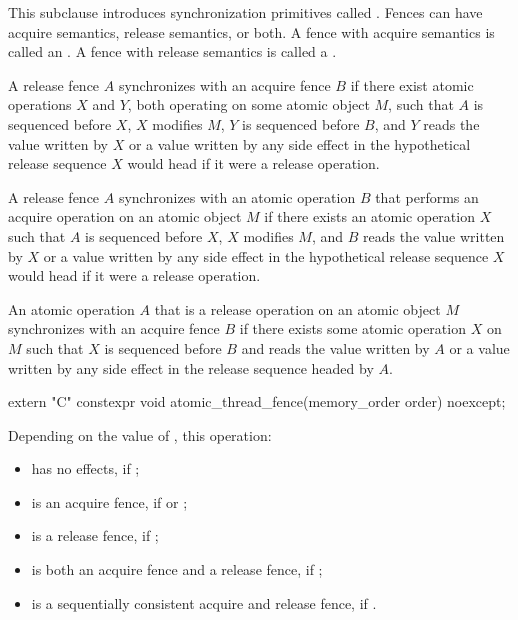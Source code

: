 \pnum
This subclause introduces synchronization primitives called . Fences can have
acquire semantics, release semantics, or both. A fence with acquire semantics is called
an . A fence with release semantics is called a .

\pnum
A release fence $A$ synchronizes with an acquire fence $B$ if there exist
atomic operations $X$ and $Y$, both operating on some atomic object
$M$, such that $A$ is sequenced before $X$, $X$ modifies
$M$, $Y$ is sequenced before $B$, and $Y$ reads the value
written by $X$ or a value written by any side effect in the hypothetical release
sequence $X$ would head if it were a release operation.

\pnum
A release fence $A$ synchronizes with an atomic operation $B$ that
performs an acquire operation on an atomic object $M$ if there exists an atomic
operation $X$ such that $A$ is sequenced before $X$, $X$
modifies $M$, and $B$ reads the value written by $X$ or a value
written by any side effect in the hypothetical release sequence $X$ would head if
it were a release operation.

\pnum
An atomic operation $A$ that is a release operation on an atomic object
$M$ synchronizes with an acquire fence $B$ if there exists some atomic
operation $X$ on $M$ such that $X$ is sequenced before $B$
and reads the value written by $A$ or a value written by any side effect in the
release sequence headed by $A$.

%
\begin{itemdecl}
extern "C" constexpr void atomic_thread_fence(memory_order order) noexcept;
\end{itemdecl}

\begin{itemdescr}
\pnum
\effects
Depending on the value of , this operation:
\begin{itemize}
\item has no effects, if ;

\item is an acquire fence, if  or ;

\item is a release fence, if ;

\item is both an acquire fence and a release fence, if ;

\item is a sequentially consistent acquire and release fence, if .
\end{itemize}
\end{itemdescr}

